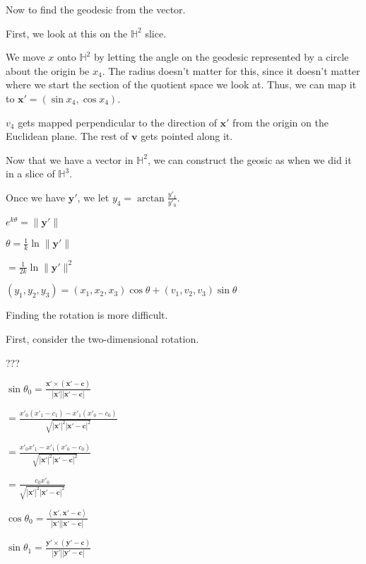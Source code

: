 \documentclass[12pt]{amsart}
\begin{document}
\bigskip

Now to find the geodesic from the vector.

\bigskip

First, we look at this on the $\mathbb{H}^2$ slice.

We move $x$ onto $\mathbb{H}^2$ by letting the angle on the geodesic represented by a circle about the origin be $x_4$. The radius doesn't matter for this, since it doesn't matter where we start the section of the quotient space we look at. Thus, we can map it to $\textbf{x}' = (\sin x_4,\cos x_4)$.

$v_4$ gets mapped perpendicular to the direction of $\textbf{x}'$ from the origin on the Euclidean plane. The rest of $\textbf{v}$ gets pointed along it.

Now that we have a vector in $\mathbb{H}^2$, we can construct the geosic as when we did it in a slice of $\mathbb{H}^3$.

Once we have $\textbf{y}'$, we let $y_4 = \arctan\frac{y'_1}{y'_0}$.

$e^{k\theta} = \|\textbf{y}'\|$

$\theta = \frac{1}{k}\ln\|\textbf{y}'\|$

$= \frac{1}{2k}\ln\|\textbf{y}'\|^2$

$(y_1,y_2,y_3) = (x_1,x_2,x_3)\cos\theta + (v_1,v_2,v_3)\sin\theta$

Finding the rotation is more difficult.

First, consider the two-dimensional rotation.

???


$\sin\theta_0 = \frac{\textbf{x}' \times (\textbf{x}'-\textbf{c})}{|\textbf{x}'||\textbf{x}'-\textbf{c}|}$

$= \frac{x'_0(x'_1-c_1) - x'_1(x'_0-c_0)}{\sqrt{|\textbf{x}'|^2|\textbf{x}'-\textbf{c}|^2}}$

$= \frac{x'_0 x'_1 - x'_1(x'_0-c_0)}{\sqrt{|\textbf{x}'|^2|\textbf{x}'-\textbf{c}|^2}}$

$= \frac{c_0 x'_0}{\sqrt{|\textbf{x}'|^2|\textbf{x}'-\textbf{c}|^2}}$

$\cos\theta_0 = \frac{\left<\textbf{x}',\textbf{x}'-\textbf{c}\right>}{|\textbf{x}'||\textbf{x}'-\textbf{c}|}$

$\sin\theta_1 = \frac{\textbf{y}' \times (\textbf{y}'-\textbf{c})}{|\textbf{y}'||\textbf{y}'-\textbf{c}|}$
\end{document}
